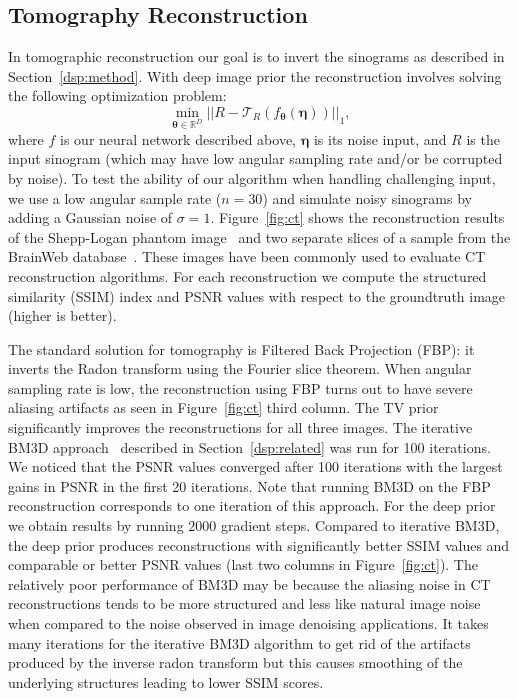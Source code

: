 \subsection{Tomography Reconstruction}
In tomographic reconstruction our goal is to invert the sinograms as described in Section~\ref{dsp:method}.
With deep image prior the reconstruction involves solving the following optimization problem:
\begin{equation}
	\min_{\bm{\theta} \in \mathbb{R}^D} ||R - \mathcal{T}_R(f_{\bm{\theta}}(\bm{\eta}))||_1,
\end{equation}
where $f$ is our neural network described above, $\bm{\eta}$ is its noise input, and $R$ is the input sinogram (which may have low angular sampling rate and/or be corrupted by noise). To test the ability of our algorithm when handling challenging input, we use a low angular sample rate ($n=30$) and simulate noisy sinograms by adding a Gaussian noise of $\sigma=1$.
Figure~\ref{fig:ct} shows the reconstruction results of the Shepp-Logan phantom image~\cite{shepp1974fourier} and two separate slices of a sample from the BrainWeb database~\cite{cocosco1997brainweb}.
These images have been commonly used to evaluate CT reconstruction algorithms.
For each reconstruction we compute the structured similarity (SSIM) index and PSNR values with respect to the groundtruth image (higher is better).

The standard solution for tomography is Filtered Back Projection (FBP): it inverts the Radon transform using the Fourier slice theorem. When angular sampling rate is low, the reconstruction using FBP turns out to have severe aliasing artifacts as seen in Figure~\ref{fig:ct} third column.
The TV prior significantly improves the reconstructions for all three images.
The iterative BM3D approach~\cite{maggioni2013nonlocal} described in Section~\ref{dsp:related} was run for 100 iterations. We noticed that the PSNR values converged after 100 iterations with the largest gains in PSNR in the first 20 iterations.
Note that running BM3D on the FBP reconstruction corresponds to one iteration of this approach.
For the deep prior we obtain results by running $2000$ gradient steps.
Compared to iterative BM3D, the deep prior produces reconstructions with significantly better SSIM values and comparable or better PSNR values (last two columns in Figure~\ref{fig:ct}).
The relatively poor performance of BM3D may be because the aliasing noise in CT reconstructions tends to be more structured and less like natural image noise when compared to the noise observed in image denoising applications.
It takes many iterations for the iterative BM3D algorithm to get rid of the artifacts produced by the inverse radon transform but this causes smoothing of the underlying structures leading to lower SSIM scores.

